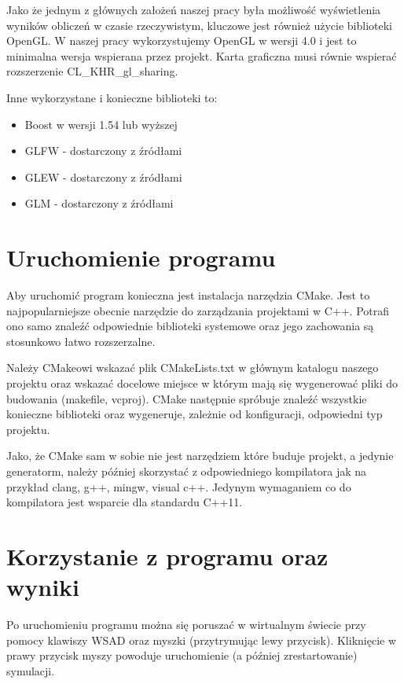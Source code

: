 \documentclass[polish, 12pt]{aghthesis}
\begin{document}
		Jako że jednym z głównych założeń naszej pracy była możliwość wyświetlenia wyników obliczeń w czasie rzeczywistym, kluczowe jest również użycie biblioteki OpenGL. W naszej pracy wykorzystujemy OpenGL w wersji 4.0 i jest to minimalna wersja wspierana przez projekt. Karta graficzna musi równie wspierać rozszerzenie CL\_KHR\_gl\_sharing.
		
		Inne wykorzystane i konieczne biblioteki to:
		\begin{itemize}
		\item Boost w wersji 1.54 lub wyższej
		\item GLFW - dostarczony z źródłami
		\item GLEW - dostarczony z źródłami
		\item GLM - dostarczony z źródłami
		\end{itemize}
		
	\section{Uruchomienie programu}
		Aby uruchomić program konieczna jest instalacja narzędzia CMake. Jest to najpopularniejsze obecnie narzędzie do zarządzania projektami w C++. Potrafi ono samo znaleźć odpowiednie biblioteki systemowe oraz jego zachowania są stosunkowo łatwo rozszerzalne.
		
		Należy CMakeowi wskazać plik CMakeLists.txt w głównym katalogu naszego projektu oraz wskazać docelowe miejsce w którym mają się wygenerować pliki do budowania (makefile, vcproj). CMake następnie spróbuje znaleźć wszystkie konieczne biblioteki oraz wygeneruje, zależnie od konfiguracji, odpowiedni typ projektu.
		
		 Jako, że CMake sam w sobie nie jest narzędziem które buduje projekt, a jedynie generatorm, należy później skorzystać z odpowiedniego kompilatora jak na przykład clang, g++, mingw, visual c++. Jedynym wymaganiem co do kompilatora jest wsparcie dla standardu C++11.
		 
	\section{Korzystanie z programu oraz wyniki}
		Po uruchomieniu programu można się poruszać w wirtualnym świecie przy pomocy klawiszy WSAD oraz myszki (przytrymując lewy przycisk). Kliknięcie w prawy przycisk myszy powoduje uruchomienie (a później zrestartowanie) symulacji.
		
\end{document}
